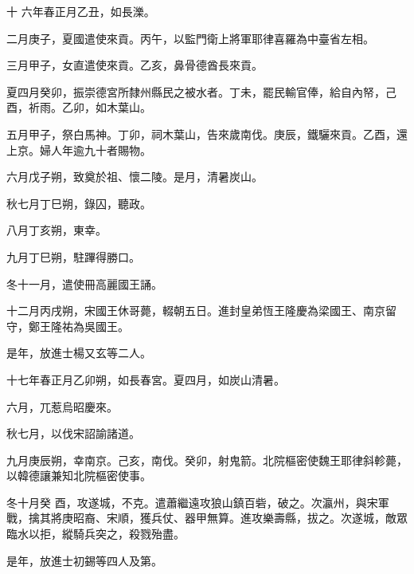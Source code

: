 
\begin{pinyinscope}

 十
 六年春正月乙丑，如長濼。



 二月庚子，夏國遣使來貢。丙午，以監門衛上將軍耶律喜羅為中臺省左相。



 三月甲子，女直遣使來貢。乙亥，鼻骨德酋長來貢。



 夏四月癸卯，振崇德宮所隸州縣民之被水者。丁未，罷民輸官俸，給自內帑，己酉，祈雨。乙卯，如木葉山。



 五月甲子，祭白馬神。丁卯，祠木葉山，告來歲南伐。庚辰，鐵驪來貢。乙酉，還
 上京。婦人年逾九十者賜物。



 六月戊子朔，致奠於祖、懷二陵。是月，清暑炭山。



 秋七月丁巳朔，錄囚，聽政。



 八月丁亥朔，東幸。



 九月丁巳朔，駐蹕得勝口。



 冬十一月，遣使冊高麗國王誦。



 十二月丙戌朔，宋國王休哥薨，輟朝五日。進封皇弟恆王隆慶為梁國王、南京留守，鄭王隆祐為吳國王。



 是年，放進士楊又玄等二人。



 十七年春正月乙卯朔，如長春宮。夏四月，如炭山清暑。



 六月，兀惹烏昭慶來。



 秋七月，以伐宋詔諭諸道。



 九月庚辰朔，幸南京。己亥，南伐。癸卯，射鬼箭。北院樞密使魏王耶律斜軫薨，以韓德讓兼知北院樞密使事。



 冬十月癸
 酉，攻遂城，不克。遣蕭繼遠攻狼山鎮百砦，破之。次瀛州，與宋軍戰，擒其將庚昭裔、宋順，獲兵仗、器甲無算。進攻樂壽縣，拔之。次遂城，敵眾臨水以拒，縱騎兵突之，殺戮殆盡。



 是年，放進士初錫等四人及第。




\end{pinyinscope}
